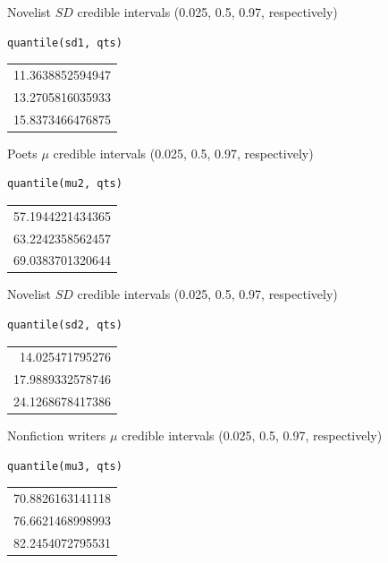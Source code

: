 \documentclass[11pt]{article}
\begin{document}
Novelist \(SD\) credible intervals (0.025, 0.5, 0.97, respectively)
\begin{verbatim}
quantile(sd1, qts)
\end{verbatim}

\begin{center}
\begin{tabular}{r}
11.3638852594947\\
13.2705816035933\\
15.8373466476875\\
\end{tabular}
\end{center}

Poets \(\mu\) credible intervals (0.025, 0.5, 0.97, respectively)
\begin{verbatim}
quantile(mu2, qts)
\end{verbatim}

\begin{center}
\begin{tabular}{r}
57.1944221434365\\
63.2242358562457\\
69.0383701320644\\
\end{tabular}
\end{center}

Novelist \(SD\) credible intervals (0.025, 0.5, 0.97, respectively)
\begin{verbatim}
quantile(sd2, qts)
\end{verbatim}

\begin{center}
\begin{tabular}{r}
14.025471795276\\
17.9889332578746\\
24.1268678417386\\
\end{tabular}
\end{center}

Nonfiction writers \(\mu\) credible intervals (0.025, 0.5, 0.97, respectively)
\begin{verbatim}
quantile(mu3, qts)
\end{verbatim}

\begin{center}
\begin{tabular}{r}
70.8826163141118\\
76.6621468998993\\
82.2454072795531\\
\end{tabular}
\end{center}
\end{document}
